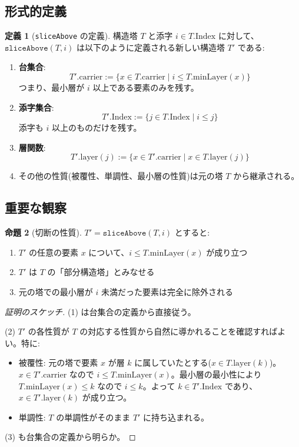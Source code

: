 \documentclass[a4paper,11pt]{article}
\theoremstyle{definition}
\newtheorem{definition}{定義}[section]
\newtheorem{proposition}[definition]{命題}
\begin{document}
\subsection{形式的定義}

\begin{definition}[\texttt{sliceAbove} の定義]
構造塔 $T$ と添字 $i \in T.\text{Index}$ に対して、$\texttt{sliceAbove}(T, i)$ は以下のように定義される新しい構造塔 $T'$ である:

\begin{enumerate}
    \item \textbf{台集合}: 
    \[
    T'.\text{carrier} := \{x \in T.\text{carrier} \mid i \leq T.\text{minLayer}(x)\}
    \]
    つまり、最小層が $i$ 以上である要素のみを残す。
    
    \item \textbf{添字集合}:
    \[
    T'.\text{Index} := \{j \in T.\text{Index} \mid i \leq j\}
    \]
    添字も $i$ 以上のものだけを残す。
    
    \item \textbf{層関数}:
    \[
    T'.\text{layer}(j) := \{x \in T'.\text{carrier} \mid x \in T.\text{layer}(j)\}
    \]
    
    \item その他の性質(被覆性、単調性、最小層の性質)は元の塔 $T$ から継承される。
\end{enumerate}
\end{definition}

\subsection{重要な観察}

\begin{proposition}[切断の性質]
$T' = \texttt{sliceAbove}(T, i)$ とすると:
\begin{enumerate}
    \item $T'$ の任意の要素 $x$ について、$i \leq T.\text{minLayer}(x)$ が成り立つ
    \item $T'$ は $T$ の「部分構造塔」とみなせる
    \item 元の塔での最小層が $i$ 未満だった要素は完全に除外される
\end{enumerate}
\end{proposition}

\begin{proof}[証明のスケッチ]
(1) は台集合の定義から直接従う。

(2) $T'$ の各性質が $T$ の対応する性質から自然に導かれることを確認すればよい。特に:
\begin{itemize}
    \item 被覆性: 元の塔で要素 $x$ が層 $k$ に属していたとする($x \in T.\text{layer}(k)$)。$x \in T'.\text{carrier}$ なので $i \leq T.\text{minLayer}(x)$。最小層の最小性により $T.\text{minLayer}(x) \leq k$ なので $i \leq k$。よって $k \in T'.\text{Index}$ であり、$x \in T'.\text{layer}(k)$ が成り立つ。
    
    \item 単調性: $T$ の単調性がそのまま $T'$ に持ち込まれる。
\end{itemize}

(3) も台集合の定義から明らか。
\end{proof}
\end{document}
